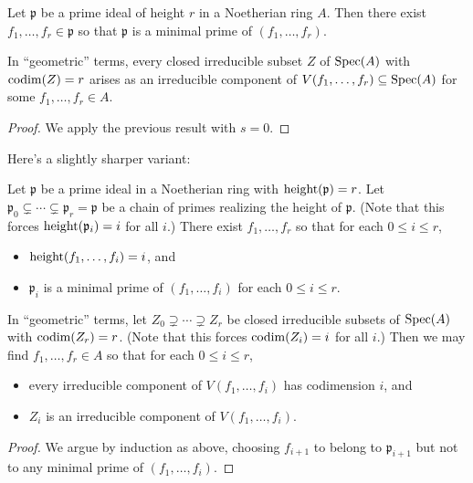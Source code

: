 \documentclass[reqno]{amsart}
\begin{document}
\begin{corollary}\label{cor:existence-parameters-for-prime}
  Let $\mathfrak{p}$ be a prime ideal of height $r$ in a
  Noetherian ring $A$.  Then there exist
  $f_1,\dotsc,f_r \in \mathfrak{p}$ so that $\mathfrak{p}$ is a
  minimal prime of $(f_1,\dotsc,f_r)$.  

  In ``geometric'' terms, every closed irreducible subset $Z$ of
  $\operatorname{Spec}(A)$ with $\operatorname{codim}(Z) = r$ arises as an irreducible
  component of $V(f_1,\dotsc,f_r) \subseteq \operatorname{Spec}(A)$ for some
  $f_1,\dotsc,f_r \in A$.
\end{corollary}
\begin{proof}
  We apply the previous result
  with $s = 0$.
\end{proof}

Here's a slightly sharper variant:
\begin{theorem}
  Let $\mathfrak{p}$ be a prime ideal in a Noetherian ring
  with $\operatorname{height}(\mathfrak{p}) = r$.
  Let
  $\mathfrak{p}_0 \subsetneq \dotsb \subsetneq \mathfrak{p}_r =
  \mathfrak{p}$ be a chain of primes
  realizing the height of $\mathfrak{p}$.
  (Note that this forces $\operatorname{height}(\mathfrak{p}_i) = i$ for all $i$.)
  There exist
  $f_1,\dotsc,f_r$ so that
  for each $0 \leq i \leq r$,
  \begin{itemize}
  \item $\operatorname{height}(f_1,\dotsc,f_i) = i$, and
  \item $\mathfrak{p}_i$ is a
    minimal prime of $(f_1,\dotsc,f_i)$ for each $0 \leq i \leq
    r$.
  \end{itemize}

  In ``geometric'' terms,
  let $Z_0 \supsetneq \dotsb \supsetneq Z_r$
  be closed irreducible subsets of $\operatorname{Spec}(A)$
  with $\operatorname{codim}(Z_r) = r$.
  (Note that this forces $\operatorname{codim}(Z_i) = i$ for all $i$.)
  Then we may find $f_1,\dotsc,f_r \in A$
  so that for each $0 \leq i \leq r$,
  \begin{itemize}
  \item every irreducible component of $V(f_1,\dotsc,f_i)$
    has codimension $i$, and
  \item $Z_i$ is an irreducible component of
    $V(f_1,\dotsc,f_i)$.
  \end{itemize}
\end{theorem}
\begin{proof}
  We argue by induction as above,
  choosing $f_{i+1}$ to belong to $\mathfrak{p}_{i+1}$
  but not to any minimal prime of $(f_1,\dotsc,f_i)$.
\end{proof}
\end{document}
